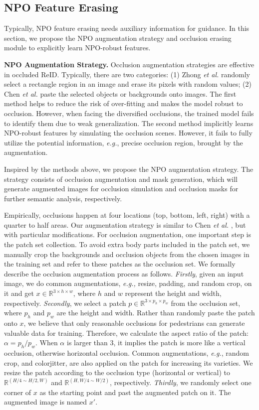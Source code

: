 \documentclass[10pt,twocolumn,letterpaper]{article}
\begin{document}
\subsection{NPO Feature Erasing}
Typically, NPO feature erasing needs auxiliary information for guidance. In this section, we propose the NPO augmentation strategy and occlusion erasing module to explicitly learn NPO-robust features. 

\textbf{NPO Augmentation Strategy.}
Occlusion augmentation strategies are effective in occluded ReID. Typically, there are two categories: (1) Zhong \emph{et al.} \cite{zhong2020random} randomly select a rectangle region in an image and erase its pixels with random values; (2) Chen \emph{et al.} \cite{chen2021occlude} paste the selected objects or backgrounds onto images. The first method helps to reduce the risk of over-fitting and makes the model robust to occlusion. However, when facing the diversified occlusions, the trained model fails to identify them due to weak generalization. The second method implicitly learns NPO-robust features by simulating the occlusion scenes. However, it fails to fully utilize the potential information, \emph{e.g.}, precise occlusion region, brought by the augmentation.


Inspired by the methods above, we propose the NPO augmentation strategy. The strategy consists of occlusion augmentation and mask generation, which will generate augmented images for occlusion simulation and occlusion masks for further semantic analysis, respectively. 


Empirically, occlusions happen at four locations (top, bottom, left, right) with a quarter to half areas. Our augmentation strategy is similar to Chen \emph{et al.} \cite{chen2021occlude}, but with particular modifications. For occlusion augmentation, one important step is the patch set collection. To avoid extra body parts included in the patch set, we manually crop the backgrounds and occlusion objects from the chosen images in the training set and refer to these patches as the occlusion set. 
We formally describe the occlusion augmentation process as follows. \emph{Firstly}, given an input image, we do common augmentations, \emph{e.g.,} resize, padding, and random crop, on it and get $x \in \mathbb{R}^{3 \times h \times w}$, where $h$ and $w$ represent the height and width, respectively.
\emph{Secondly}, we select a patch $p \in \mathbb{R}^{3 \times p_h \times p_w}$ from the occlusion set, where $p_h$ and $p_w$ are the height and width. Rather than randomly paste the patch onto $x$, we believe that only reasonable occlusions for pedestrians can generate valuable data for training. 
Therefore, we calculate the aspect ratio of the patch: $\alpha = p_h / p_w$. When $\alpha$ is larger than 3, it implies the patch is more like a vertical occlusion, otherwise horizontal occlusion. 
Common augmentations, \emph{e.g.}, random crop, and colorjitter, are also applied on the patch for increasing its varieties. We resize the patch according to the occlusion type (horizontal or vertical) to $\mathbb{R}^{(H/4 \sim H/2, W)} $ and $\mathbb{R}^{(H, W/4 \sim W/2)}$, respectively. \emph{Thirdly}, we randomly select one corner of $x$ as the starting point and past the augmented patch on it. The augmented image is named $x'$.
\end{document}
